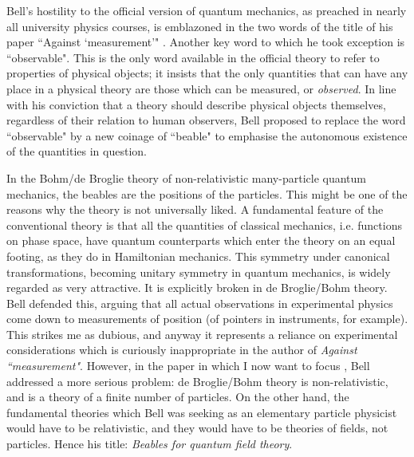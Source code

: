 \documentclass[12pt,a4paper,reqno]{article}
\renewcommand{\(}{\left(}
\renewcommand{\)}{\right)}
\renewcommand{\.}{\centerdot}
\newcommand{\1}{\mathbf{1}}
\newcommand{\<}{\langle}
\renewcommand{\>}{\rangle}
\theoremstyle{definition}
\theoremstyle{remark}
\numberwithin{equation}{section}
\begin{document}
Bell's hostility to the official version of quantum mechanics, as preached in nearly all university physics courses, is emblazoned in the two words of the title of his paper ``Against `measurement'" \cite{Bell:piddling}. Another key word to which he took exception is ``observable". This is the only word available in the official theory to refer to properties of physical objects; it insists that the only quantities that can have any place in a physical theory are those which can be measured, or \emph{observed}. In line with his conviction that a theory should describe physical objects themselves, regardless of their relation to human observers, Bell proposed \cite{Bell:subjobj} to replace the word ``observable" by a new coinage of ``beable"
 to emphasise the autonomous existence of the quantities in question. 

In the Bohm/de Broglie theory of non-relativistic many-particle quantum mechanics, the beables are the positions of the particles. This might be one of the reasons why the theory is not universally liked. A fundamental feature of the conventional theory is that all the quantities of classical mechanics, i.e. functions on phase space, have quantum counterparts which enter the theory on an equal footing, as they do in Hamiltonian mechanics. This symmetry under canonical transformations, becoming unitary symmetry in quantum mechanics, is widely regarded as very attractive. It is explicitly broken in de Broglie/Bohm theory. Bell defended this, arguing that all actual observations in experimental physics come down to measurements of position (of pointers in instruments, for example). This strikes me as dubious, and anyway it represents a reliance on experimental considerations which is curiously inappropriate in the author of \emph{Against ``measurement"}. However, in the paper in which I now want to focus \cite{Bell:beables}, Bell addressed a more serious problem: de Broglie/Bohm theory is non-relativistic, and is a theory of a finite number of particles. On the other hand, the fundamental theories which Bell was seeking as an elementary particle physicist would have to be relativistic, and they would have to be theories of fields, not particles. Hence his title: \emph{Beables for quantum field theory}.
\end{document}
